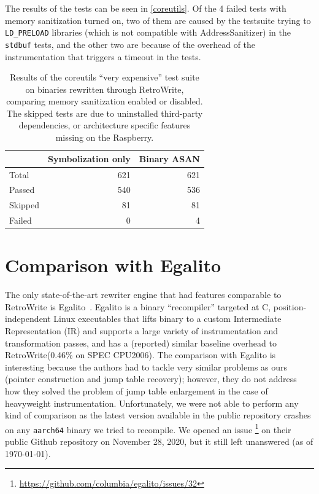 \documentclass[a4paper,11pt,oneside]{report}
\newcommand{\sysname}{RetroWrite\xspace}
\begin{document}
The results of the tests can be seen in \autoref{coreutils}. Of the 4 failed
tests with memory sanitization turned on, two of them are caused by the
testsuite trying to \texttt{LD\_PRELOAD} libraries (which is not compatible
with AddressSanitizer) in the \texttt{stdbuf} tests, and the other two are
because of the overhead of the instrumentation that triggers a timeout in the
tests.




\begin{table}
\centering
\begin{tabular}{lrr}
\toprule
	& \textbf{Symbolization only} & \textbf{Binary ASAN} \\
\toprule
	Total              & 621 & 621 \\
	Passed              & 540  & 536  \\
	Skipped              & 81  & 81  \\
	Failed              & 0  & 4  \\
\bottomrule
\end{tabular}
\caption{Results of the coreutils ``very expensive'' test suite on binaries rewritten through \sysname, comparing memory sanitization enabled or disabled. The skipped tests are due to uninstalled third-party dependencies, or architecture specific features missing on the Raspberry.}
\label{coreutils}
\end{table}



\section{Comparison with Egalito}
The only state-of-the-art rewriter engine that had features comparable to
\sysname is Egalito~\cite{egalito}. Egalito is a binary ``recompiler'' targeted
at C, position-independent Linux executables that lifts binary to a custom
Intermediate Representation (IR) and supports a large variety of
instrumentation and transformation passes, and has a (reported) similar
baseline overhead to \sysname (0.46\% on SPEC CPU2006). The comparison with
Egalito is interesting because the authors had to tackle very similar problems
as ours (pointer construction and jump table recovery); however, they do not
address how they solved the problem of jump table enlargement in the case of
heavyweight instrumentation.  Unfortunately, we were not able to perform any
kind of comparison as the latest version available in the public repository
crashes on any \texttt{aarch64} binary we tried to recompile. We opened an
issue \footnote{\url{https://github.com/columbia/egalito/issues/32}} on their
public Github repository on November 28, 2020, but it still left unanswered (as of \today).
\end{document}

